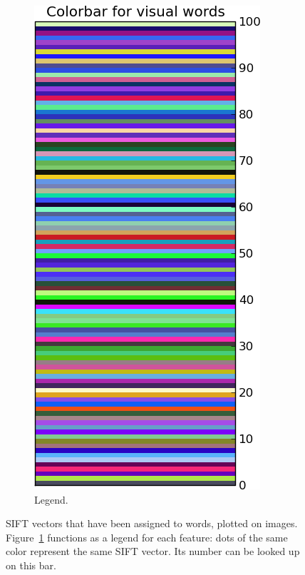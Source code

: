 \documentclass[a4paper,10pt]{article}
\begin{document}
\begin{figure}
\begin{subfigure}{0.49\textwidth}
    \includegraphics[width=\textwidth,height=.3\textheight,keepaspectratio]{colorbar}
    \caption{Legend.}
    \label{sfig:colorbar}
  \end{subfigure}
  \caption{SIFT vectors that have been assigned to words, plotted on images.  Figure~\ref{sfig:colorbar} functions as a legend for each feature: dots of the same color represent the same SIFT vector.  Its number can be looked up on this bar.}
  \label{fig:wordsonimage}
\end{figure}
\end{document}
